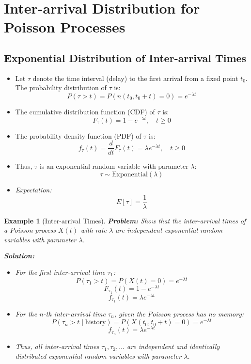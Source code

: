 \documentclass[12pt]{article}
\newtheorem{example}{Example}
\begin{document}
\section{Inter-arrival Distribution for Poisson Processes}

\subsection{Exponential Distribution of Inter-arrival Times}
\begin{itemize}
    \item Let \( \tau \) denote the time interval (delay) to the first arrival from a fixed point \( t_0 \). The probability distribution of \( \tau \) is:
    \[
    P(\tau > t) = P(n(t_0, t_0 + t) = 0) = e^{-\lambda t}
    \]
    \item The cumulative distribution function (CDF) of \( \tau \) is:
    \[
    F_{\tau}(t) = 1 - e^{-\lambda t}, \quad t \geq 0
    \]
    \item The probability density function (PDF) of \( \tau \) is:
    \[
    f_{\tau}(t) = \frac{d}{dt} F_{\tau}(t) = \lambda e^{-\lambda t}, \quad t \geq 0
    \]
    \item Thus, \( \tau \) is an exponential random variable with parameter \( \lambda \):
    \[
    \tau \sim \text{Exponential}(\lambda)
    \]
    \item \textit{Expectation:}
    \[
    E[\tau] = \frac{1}{\lambda}
    \]
\end{itemize}

\begin{example}[Inter-arrival Times]
    \textbf{Problem:} Show that the inter-arrival times of a Poisson process \( X(t) \) with rate \( \lambda \) are independent exponential random variables with parameter \( \lambda \).
    
    \textbf{Solution:}
    \begin{itemize}
        \item For the first inter-arrival time \( \tau_1 \):
        \[
        P(\tau_1 > t) = P(X(t) = 0) = e^{-\lambda t}
        \]
        \[
        F_{\tau_1}(t) = 1 - e^{-\lambda t}
        \]
        \[
        f_{\tau_1}(t) = \lambda e^{-\lambda t}
        \]
        
        \item For the \( n \)-th inter-arrival time \( \tau_n \), given the Poisson process has no memory:
        \[
        P(\tau_n > t \mid \text{history}) = P(X(t_0, t_0 + t) = 0) = e^{-\lambda t}
        \]
        \[
        f_{\tau_n}(t) = \lambda e^{-\lambda t}
        \]
        
        \item Thus, all inter-arrival times \( \tau_1, \tau_2, \ldots \) are independent and identically distributed exponential random variables with parameter \( \lambda \).
    \end{itemize}
\end{example}
\end{document}
